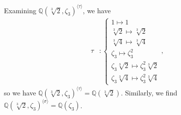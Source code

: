 \documentclass[10pt]{extarticle}
\newcommand{\Q}{\mathbb{Q}}
\begin{document}
\begin{enumerate}[(1)]
      Examining $\Q(\sqrt[3]{2},\zeta_3)^{\langle \tau \rangle}$, we have
      \begin{align*}
          \tau &: \begin{cases}
          1 \mapsto 1\\
          \sqrt[3]{2} \mapsto \sqrt[3]{2}\\
          \sqrt[3]{4} \mapsto \sqrt[3]{4}\\
          \zeta_3 \mapsto \zeta_3^2\\
          \zeta_3\sqrt[3]{2} \mapsto \zeta_3^2 \sqrt[3]{2}\\
          \zeta_3\sqrt[3]{4} \mapsto \zeta_3^2\sqrt[3]{4}
          \end{cases},
      \end{align*}
      so we have $\Q(\sqrt[3]{2},\zeta_3)^{\langle \tau \rangle} = \Q(\sqrt[3]{2})$. Similarly, we find $\Q(\sqrt[3]{2},\zeta_3)^{\langle \sigma \rangle} = \Q(\zeta_3)$.\\


\end{enumerate}
\end{document}
